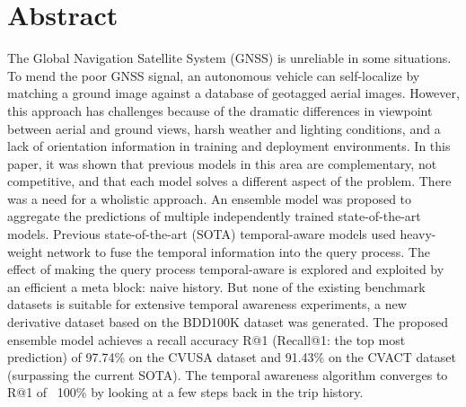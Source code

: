 \documentclass[10pt,letterpaper]{article}
\newif\ifhighlight
\newcommand{\hlb}[1]{\ifhighlight{\hl{#1}}\else{#1}\fi}
\begin{document}
\section*{Abstract}
The Global Navigation Satellite System (GNSS) is unreliable in some situations. To mend the poor GNSS signal, an autonomous vehicle can self-localize by matching a ground image against a database of geotagged aerial images. However, this approach has challenges because of the dramatic differences in viewpoint between aerial and ground views, harsh weather and lighting conditions, and a lack of orientation information in training and deployment environments. In this paper, \hlb{it was shown that previous models in} this area are complementary, not competitive, and that each model solves a different aspect of the problem. \hlb{There was a need for a wholistic approach.} \hlb{An ensemble model was proposed} to aggregate the predictions of multiple independently trained state-of-the-art models. \hlb{Previous state-of-the-art (SOTA) temporal-aware models  used heavy-weight network to fuse the temporal information into the query process. The effect of making the query process temporal-aware is explored and exploited by an efficient a meta block: naive history}. But none of the existing benchmark datasets is suitable for extensive temporal awareness experiments, \hlb{a new derivative dataset based on the BDD100K dataset was generated}. \hlb{The proposed ensemble model achieves} a recall accuracy R@1 \hlb{(Recall@1: the top most prediction)} of 97.74\% on the CVUSA dataset and 91.43\% on the CVACT dataset (surpassing the current \hlb{SOTA}). The  temporal awareness algorithm converges to R@1 of ~100\% by looking at a few steps back in the trip history.

\linenumbers

\end{document}
